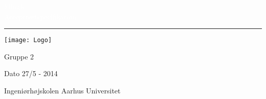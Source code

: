 \thispagestyle{empty} %

\BgThispage
{}
\vspace*{2cm}
\noindent
\textcolor{white}{\bigsf Mingle \\ Accepttestspecifikation}
\vspace*{2.5cm}\par
\noindent
\begin{minipage}{0.45\linewidth}
    \begin{flushright}
        \printauthor
    \end{flushright}
\end{minipage} \hspace{30pt}
%
\begin{minipage}{0.02\linewidth}
    \rule{1pt}{275pt}
\end{minipage} \hspace{-10pt}
%
\begin{minipage}{0.6\linewidth}
\vspace{5pt}
 

\texttt{[image: Logo]}
  
Gruppe 2 \newline

Dato 27/5 - 2014 \newline

Ingeniørhøjskolen Aarhus Universitet \newline





\end{minipage}
\restoregeometry


